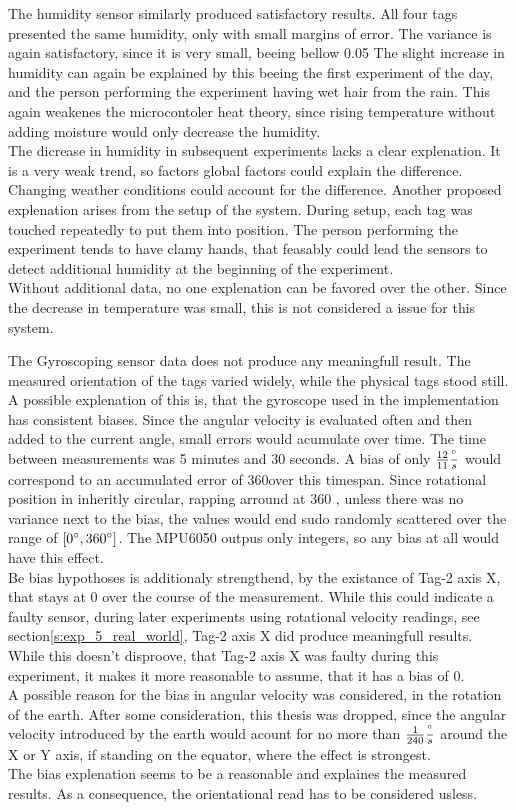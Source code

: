 The humidity sensor similarly produced satisfactory results.
All four tags presented the same humidity, only with small margins of error.
The variance is again satisfactory, since it is very small, beeing bellow 0.05%
The slight increase in humidity can again be explained by this beeing the first experiment of the day, and the person performing the experiment having wet hair from the rain.
This again weakenes the microcontoler heat theory, since rising temperature without adding moisture would only decrease the humidity.\\
The dicrease in humidity in subsequent experiments lacks a clear explenation.
It is a very weak trend, so factors global factors could explain the difference.
Changing weather conditions could account for the difference.
Another proposed explenation arises from the setup of the system.
During setup, each tag was touched repeatedly to put them into position.
The person performing the experiment tends to have clamy hands, that feasably could lead the sensors to detect additional humidity at the beginning of the experiment.\\
Without additional data, no one explenation can be favored over the other. 
Since the decrease in temperature was small, this is not considered a issue for this system.


The Gyroscoping sensor data does not produce any meaningfull result.
The measured orientation of the tags varied widely, while the physical tags stood still.
A possible explenation of this is, that the gyroscope used in the implementation has consistent biases.
Since the angular velocity is evaluated often and then added to the current angle, small errors would acumulate over time.
The time between measurements was 5 minutes and 30 seconds.
A bias of only $\frac{12}{11} \frac{^\circ}{s}$ would correspond to an accumulated error of 360\degree over this timespan.
Since rotational position in inheritly circular, rapping arround at 360 \degree, unless there was no variance next to the bias, the values would end sudo randomly scattered over the range of $[0^\circ , 360^\circ ]$.
The MPU6050 outpus only integers, so any bias at all would have this effect.\\
Be bias hypothoses is additionaly strengthend, by the existance of Tag-2 axis X, that stays at 0 over the course of the measurement.
While this could indicate a faulty sensor, during later experiments using rotational velocity readings, see section\ref{s:exp_5_real_world}, Tag-2 axis X did produce meaningfull results. While this doesn't disproove, that Tag-2 axis X was faulty during this experiment, it makes it more reasonable to assume, that it has a bias of 0. \\
A possible reason for the bias in angular velocity was considered, in the rotation of the earth.
After some consideration, this thesis was dropped, since the angular velocity introduced by the earth would acount for no more than $\frac{1}{240} \frac{^\circ}{s}$ around the X or Y axis, if standing on the equator, where the effect is strongest.\\
The bias explenation seems to be a reasonable and explaines the measured results.
As a consequence, the orientational read has to be considered usless.


